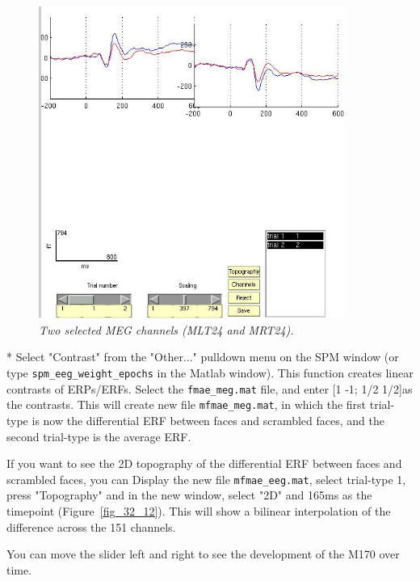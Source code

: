 \begin{figure}
\begin{center}
\includegraphics[width=100mm]{multimodal/figures/figure_32_11}
\caption{\em Two selected MEG channels (MLT24 and MRT24). \label{fig_32_11}}
\end{center}
\end{figure}

* Select "Contrast" from the "Other..." pulldown menu on the SPM window (or type \verb!spm_eeg_weight_epochs! in the Matlab window). This function creates linear contrasts of ERPs/ERFs. Select the \verb!fmae_meg.mat! file, and enter [1 -1; 1/2 1/2]as the contrasts. This will create new file \verb!mfmae_meg.mat!, in which the first trial-type is now the differential ERF between faces and scrambled faces, and the second trial-type is the average ERF.

If you want to see the 2D topography of the differential ERF between faces and scrambled faces, you can Display the new file \verb!mfmae_eeg.mat!, select trial-type 1, press "Topography" and in the new window, select "2D" and 165ms as the timepoint (Figure~\ref{fig_32_12}). This will show a bilinear interpolation of the difference across the 151 channels.

You can move the slider left and right to see the development of the M170 over time.

